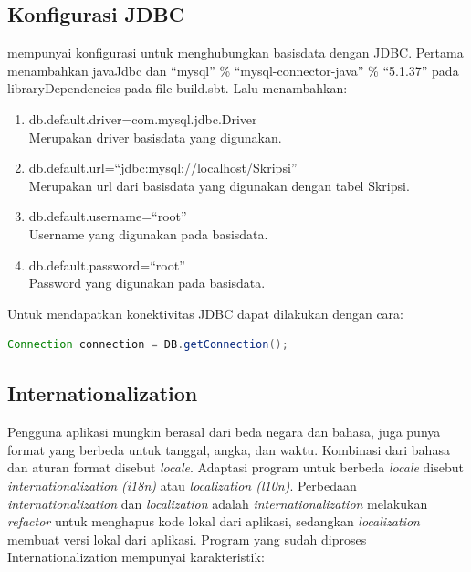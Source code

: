 \subsection{Konfigurasi JDBC}
\play mempunyai konfigurasi untuk menghubungkan basisdata dengan JDBC. Pertama menambahkan javaJdbc dan ``mysql'' \% ``mysql-connector-java'' \% ``5.1.37'' pada libraryDependencies pada file build.sbt. Lalu menambahkan:
\begin{enumerate}
	\item db.default.driver=com.mysql.jdbc.Driver\\
			Merupakan driver basisdata yang digunakan.
	\item db.default.url=``jdbc:mysql://localhost/Skripsi''\\
			Merupakan url dari basisdata yang digunakan dengan tabel Skripsi.
	\item db.default.username=``root''\\
			Username yang digunakan pada basisdata.
	\item db.default.password=``root''\\
			Password yang digunakan pada basisdata.
\end{enumerate}

Untuk mendapatkan konektivitas JDBC dapat dilakukan dengan cara:

\begin{lstlisting}[caption=Contoh mendapatkan konektivitas JDBC,label = {lst_2_konek_jdbc},language=Java]
	Connection connection = DB.getConnection();
\end{lstlisting} 

\subsection{Internationalization}
Pengguna aplikasi mungkin berasal dari beda negara dan bahasa, juga punya format yang berbeda untuk tanggal, angka, dan waktu. Kombinasi dari bahasa dan aturan format disebut \textit{locale}. Adaptasi program untuk berbeda \textit{locale} disebut \textit{internationalization (i18n)} atau \textit{localization (l10n)}. Perbedaan \textit{internationalization} dan \textit{localization} adalah \textit{internationalization} melakukan \textit{refactor} untuk menghapus kode lokal dari aplikasi, sedangkan \textit{localization} membuat versi lokal dari aplikasi. Program yang sudah diproses Internationalization mempunyai karakteristik:


